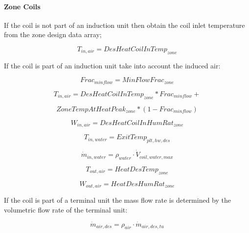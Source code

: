 \paragraph{Zone Coils}\label{zone-coils-1}

If the coil is not part of an induction unit then obtain the coil inlet temperature from the zone design data array;

\begin{equation}
T_{in,air} = DesHeatCoilInTemp_{zone}
\end{equation}

If the coil is part of an induction unit take into account the induced air:

\begin{equation}
Frac_{minflow} = MinFlowFrac_{zone}
\end{equation}

\begin{equation}
T_{in,air} = DesHeatCoilInTemp_{zone} * Frac_{minflow} +
\end{equation}

\begin{equation}
ZoneTempAtHeatPeak_{zone} *(1- Frac_{minflow})
\end{equation}

\begin{equation}
W_{in,air} = DesHeatCoilInHumRat_{zone}
\end{equation}

\begin{equation}
T_{in,water} = ExitTemp_{plt,hw,des}
\end{equation}

\begin{equation}
\dot m_{in,water} = \rho_{water} \cdot \dot V_{coil,water,max}
\end{equation}

\begin{equation}
T_{out,air} = HeatDesTemp_{zone}
\end{equation}

\begin{equation}
W_{out,air} = HeatDesHumRat_{zone}
\end{equation}

If the coil is part of a terminal unit the mass flow rate is determined by the volumetric flow rate of the terminal unit:

\begin{equation}
\dot m_{air,des} = \rho_{air} \cdot \dot m_{air,des,tu}
\end{equation}

